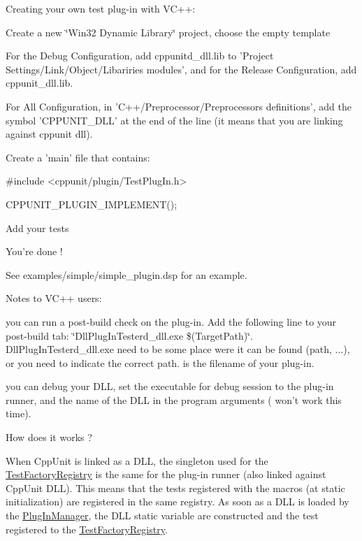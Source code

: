 Creating your own test plug-\/in with V\+C++\+:
\begin{DoxyItemize}
\item Create a new \char`\"{}\+Win32 Dynamic Library\char`\"{} project, choose the empty template
\item For the Debug Configuration, add cppunitd\+\_\+dll.\+lib to 'Project Settings/\+Link/\+Object/\+Libariries modules', and for the Release Configuration, add cppunit\+\_\+dll.\+lib.
\item For All Configuration, in 'C++/\+Preprocessor/\+Preprocessors definitions', add the symbol 'C\+P\+P\+U\+N\+I\+T\+\_\+\+D\+L\+L' at the end of the line (it means that you are linking against cppunit dll).
\item Create a 'main' file that contains\+: \begin{DoxyVerb}#include <cppunit/plugin/TestPlugIn.h>

CPPUNIT_PLUGIN_IMPLEMENT();\end{DoxyVerb}

\item Add your tests
\item You're done !
\end{DoxyItemize}

See examples/simple/simple\+\_\+plugin.\+dsp for an example.

Notes to V\+C++ users\+:
\begin{DoxyItemize}
\item you can run a post-\/build check on the plug-\/in. Add the following line to your post-\/build tab\+: \char`\"{}\+Dll\+Plug\+In\+Testerd\+\_\+dll.\+exe \$(\+Target\+Path)\char`\"{}. Dll\+Plug\+In\+Testerd\+\_\+dll.\+exe need to be some place were it can be found (path, ...), or you need to indicate the correct path.  is the filename of your plug-\/in.
\item you can debug your D\+L\+L, set the executable for debug session to the plug-\/in runner, and the name of the D\+L\+L in the program arguments ( won't work this time).
\end{DoxyItemize}

How does it works ?

When Cpp\+Unit is linked as a D\+L\+L, the singleton used for the \hyperlink{class_test_factory_registry}{Test\+Factory\+Registry} is the same for the plug-\/in runner (also linked against Cpp\+Unit D\+L\+L). This means that the tests registered with the macros (at static initialization) are registered in the same registry. As soon as a D\+L\+L is loaded by the \hyperlink{class_plug_in_manager}{Plug\+In\+Manager}, the D\+L\+L static variable are constructed and the test registered to the \hyperlink{class_test_factory_registry}{Test\+Factory\+Registry}.

